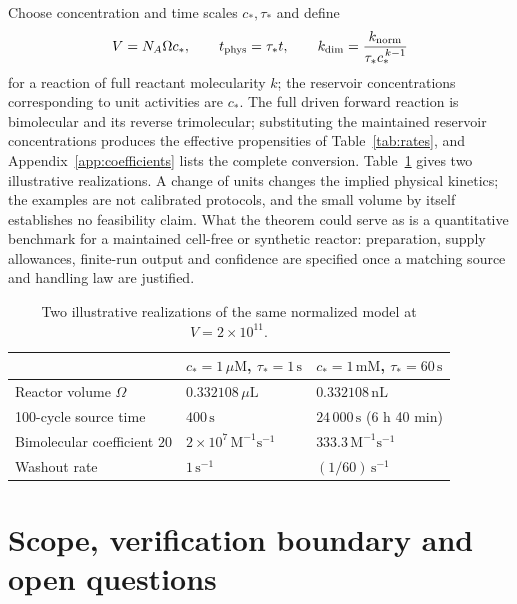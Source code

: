\documentclass[11pt,a4paper]{article}
\theoremstyle{plain}
\theoremstyle{definition}
\theoremstyle{remark}
\begin{document}
Choose concentration and time scales $c_*,\tau_*$ and define
\begin{equation}\label{eq:units}
V=N_A\Omega c_*,\qquad t_{\rm phys}=\tau_*t,\qquad k_{\rm dim}=\frac{k_{\rm norm}}{\tau_*c_*^{\,k-1}}
\end{equation}
for a reaction of full reactant molecularity $k$; the reservoir concentrations corresponding to unit activities are $c_*$. The full driven forward reaction is bimolecular and its reverse trimolecular; substituting the maintained reservoir concentrations produces the effective propensities of Table~\ref{tab:rates}, and Appendix~\ref{app:coefficients} lists the complete conversion. Table~\ref{tab:units} gives two illustrative realizations. A change of units changes the implied physical kinetics; the examples are not calibrated protocols, and the small volume by itself establishes no feasibility claim. What the theorem could serve as is a quantitative benchmark for a maintained cell-free or synthetic reactor: preparation, supply allowances, finite-run output and confidence are specified once a matching source and handling law are justified.

\begin{table}[tb]
\centering\small
\begin{tabular}{lll}
\toprule
& $c_*=1\,\mu\mathrm M$, $\tau_*=1\,\mathrm s$ & $c_*=1\,\mathrm{mM}$, $\tau_*=60\,\mathrm s$\\
\midrule
Reactor volume $\Omega$ & $0.332108\,\mu\mathrm L$ & $0.332108\,\mathrm{nL}$\\
100-cycle source time & $400\,\mathrm s$ & $24\,000\,\mathrm s$ (6 h 40 min)\\
Bimolecular coefficient $20$ & $2\times10^{7}\,\mathrm M^{-1}\mathrm s^{-1}$ & $333.3\,\mathrm M^{-1}\mathrm s^{-1}$\\
Washout rate & $1\,\mathrm s^{-1}$ & $(1/60)\,\mathrm s^{-1}$\\
\bottomrule
\end{tabular}
\caption{Two illustrative realizations of the same normalized model at $V=2\times10^{11}$.}
\label{tab:units}
\end{table}

\section{Scope, verification boundary and open questions}\label{sec:discussion}
\end{document}
